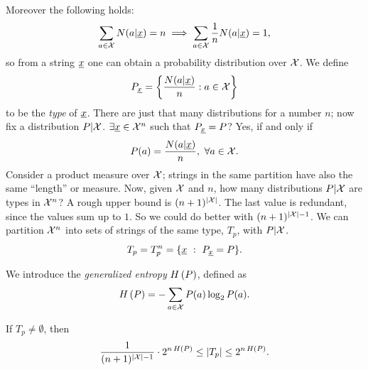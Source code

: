 Moreover the following holds:
\begin{equation*}
	\sum_{a \in \mathcal{X}} N(a|\underline{x}) = n
	\implies \sum_{a\in \mathcal{X}} \frac{1}{n} N(a|\underline{x}) = 1,
\end{equation*}
so from a string $\underline{x}$ one can obtain a probability distribution over $\mathcal{X}$.
We define
\begin{equation*}
	P_{\underline{x}} = \left\{ \frac{N(a|\underline{x})}{n} : a \in \mathcal{X} \right\}
\end{equation*}
to be the \emph{type} of $\underline{x}$.
There are just that many distributions for a number $n$; now fix a distribution $P|\mathcal{X}$.
$\exists \underline{x} \in \mathcal{X}^n$ such that  $P_{\underline{x}} = P$?
Yes, if and only if
\begin{equation*}
	P(a) = \dfrac{N(a | \underline{x})}{n},\ \forall a \in \mathcal{X}.
\end{equation*}
Consider a product measure over $\mathcal{X}$; strings in the same partition have also the same ``length'' or measure.
Now, given $\mathcal{X}$ and $n$, how many distributions $P|\mathcal{X}$ are types in $\mathcal{X}^n$?
A rough upper bound is $(n + 1)^{\left|{\mathcal{X}}\right|}$.
The last value is redundant, since the values sum up to $1$.
So we could do better with $(n + 1)^{\left|{\mathcal{X}}\right| - 1}$.
We can partition $\mathcal{X}^n$ into sets of strings of the same type, $T_p$, with $P|\mathcal{X}$.
\begin{equation*}
	T_p = T_p^n = \{\underline{x}\ :\ P_{\underline{x}} = P\}.
\end{equation*}

\begin{definition}
	We introduce the \emph{generalized entropy} $H\left({P}\right)$, defined as
	\begin{equation*}
		H\left({P}\right) = -\sum_{a \in \mathcal{X}} P(a) \log_2 P(a).
	\end{equation*}
\end{definition}

\begin{thm} \label{thms:taupcard}
	If $T_p \ne \emptyset$, then
	\begin{equation*}
		\frac{1}{(n+1)^{\left|{\mathcal{X}}\right| -1}} \cdot 2^{n \, H\left({P}\right)}
		\leq
		\left|{T_p}\right|
		\le 2^{n \, H\left({P}\right)}.
	\end{equation*}
\end{thm}

